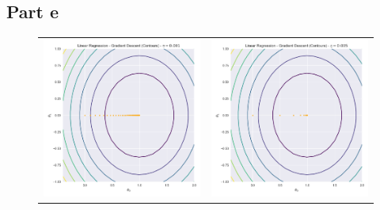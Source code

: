 \documentclass[12pt]{article}
\begin{document}
\subsection*{Part e}
\begin{figure}[!htb]
\begin{tabular}{cc}
\includegraphics[scale=0.3]{linear4.png} & 
\includegraphics[scale=0.3]{linear5.png} \\

\end{tabular}
\end{figure}
\end{document}
